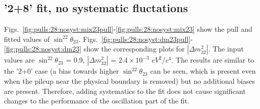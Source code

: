 \clearpage
\subsection{'2+8' fit, no systematic fluctations}

Figs.\ \ref{fig:pulls:28:nosyst:mix23pull}-\ref{fig:pulls:28:nosyst:mix23} show the pull and fitted values of
$\sin^22\theta_{23}$.
Figs.\ \ref{fig:pulls:28:nosyst:dm23pull}-\ref{fig:pulls:28:nosyst:dm23} show the corresponding plots for 
$|\Delta m^2_{32}|$.
The input values are $\sin^22\theta_{23}$ = 0.9, $|\Delta m^2_{32}|$ = $2.4 \times 10^{-3}$ $eV^2/c^4$.
The results are similar to the '2+0' case
(a bias towards higher $\sin^22\theta_{23}$ can be seen, which is present even when the pileup near the physical boundary is removed)
but no additional biases are present.
Therefore, adding systematics to the fit does not cause significant changes to the performance of the
oscillation part of the fit.

